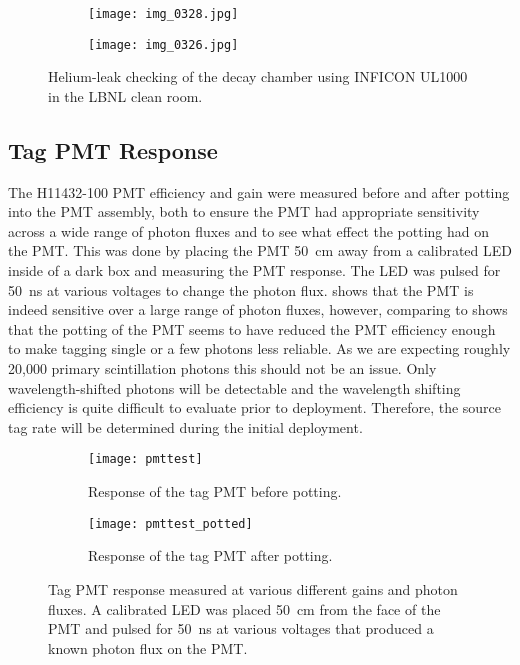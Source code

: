 \begin{figure}
\centering
\begin{subfigure}[b]{0.48\textwidth}
\centering
\texttt{[image: img\_0328.jpg]}
\end{subfigure}
\hfill
\begin{subfigure}[b]{0.45\textwidth}
\centering
\texttt{[image: img\_0326.jpg]}
\end{subfigure}
\caption{Helium-leak checking of the decay chamber using INFICON UL1000 in the LBNL clean room.}
\label{fig:HeLeakCheck}
\end{figure}

\subsection{Tag PMT Response}
\label{sec:tagpmt}
The H11432-100 PMT efficiency and gain were measured before and after potting into the PMT assembly, both to ensure the PMT had appropriate sensitivity across a wide range of photon fluxes and to see what effect the potting had on the PMT. 
This was done by placing the PMT 50~cm away from a calibrated LED inside of a dark box and measuring the PMT response.
The LED was pulsed for 50~ns at various voltages to change the photon flux. 
 shows that the PMT is indeed sensitive over a large range of photon fluxes, however, comparing  to  shows that the potting of the PMT seems to have reduced the PMT efficiency enough to make tagging single or a few photons less reliable. 
As we are expecting roughly 20,000 primary scintillation photons this should not be an issue. 
Only wavelength-shifted photons will be detectable and the wavelength shifting efficiency is quite difficult to evaluate prior to deployment.
Therefore, the source tag rate will be determined during the initial deployment.

\begin{figure}
\begin{subfigure}[t]{0.47\textwidth}
\texttt{[image: pmttest]}
\caption{Response of the tag PMT before potting.}
\label{fig:pmttest}
\end{subfigure}
\hfill
\begin{subfigure}[t]{0.47\textwidth}
\texttt{[image: pmttest\_potted]}
\caption{Response of the tag PMT after potting.}
\label{fig:pmtafterpotting}
\end{subfigure}
\caption{Tag PMT response measured at various different gains and photon fluxes. A calibrated LED was placed 50~cm from the face of the PMT and pulsed for 50~ns at various voltages that produced a known photon flux on the PMT.}
\label{fig:calibratedled}
\end{figure}

